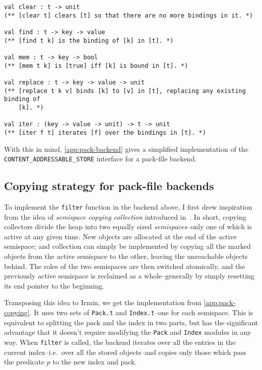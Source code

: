 \begin{itemize}
        \begin{verbatim}
val clear : t -> unit
(** [clear t] clears [t] so that there are no more bindings in it. *)

val find : t -> key -> value
(** [find t k] is the binding of [k] in [t]. *)

val mem : t -> key -> bool
(** [mem t k] is [true] iff [k] is bound in [t]. *)

val replace : t -> key -> value -> unit
(** [replace t k v] binds [k] to [v] in [t], replacing any existing binding of
    [k]. *)

val iter : (key -> value -> unit) -> t -> unit
(** [iter f t] iterates [f] over the bindings in [t]. *)
  \end{verbatim}
\end{itemize}

With this in mind, \cref{app:pack-backend} gives a simplified implementation of the \texttt{CONTENT\_ADDRESSABLE\_STORE} interface for a pack-file backend.

\subsection{Copying strategy for pack-file backends}

To implement the \texttt{filter} function in the backend above, I first drew inspiration from the idea of \emph{semispace copying collection} introduced in~\cite{feni69}. In short, copying collectors divide the heap into two equally sized \emph{semispaces}--only one of which is active at any given time. New objects are allocated at the end of the active semispace; and collection can simply be implemented by copying all the marked objects from the active semispace to the other, leaving the unreachable objects behind. The roles of the two semispaces are then switched atomically, and the previously active semispace is reclaimed as a whole--generally by simply resetting its end pointer to the beginning.

Transposing this idea to Irmin, we get the implementation from \cref{app:pack-copying}. It uses two sets of \texttt{Pack.t} and \texttt{Index.t}--one for each semispace. This is equivalent to splitting the pack and the index in two parts, but has the significant advantage that it doesn't require modifying the \texttt{Pack} and \texttt{Index} modules in any way. When \texttt{filter} is called, the backend iterates over all the entries in the current index--i.e.~over all the stored objects--and copies only those which pass the predicate \(p\) to the new index and pack.

